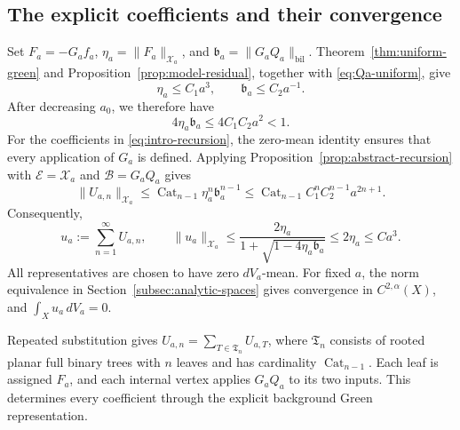 \documentclass[11pt,a4paper,twoside]{article}
\numberwithin{equation}{section}
\theoremstyle{definition}
\theoremstyle{remark}
\begin{document}
\subsection{The explicit coefficients and their convergence}
\label{subsec:binary-tree-series}
Set \(F_a=-G_af_a\),
\(\eta_a=\|F_a\|_{\mathcal X_a}\), and
\(\mathfrak b_a=\|G_aQ_a\|_{\mathrm{bil}}\).
Theorem~\ref{thm:uniform-green} and
Proposition~\ref{prop:model-residual}, together with
\eqref{eq:Qa-uniform}, give
\begin{equation}\label{eq:Fa-small}
\eta_a\le C_1a^3,
\qquad \mathfrak b_a\le C_2a^{-1}.
\end{equation}
After decreasing \(a_0\), we therefore have
\begin{equation}\label{eq:Catalan-smallness}
4\eta_a\mathfrak b_a\le4C_1C_2a^2<1.
\end{equation}
For the coefficients in \eqref{eq:intro-recursion}, the zero-mean
identity ensures that every application of \(G_a\) is defined.
Applying Proposition~\ref{prop:abstract-recursion} with
\(\mathcal E=\mathcal X_a\) and \(\mathcal B=G_aQ_a\) gives
\begin{equation}\label{eq:Catalan-estimate}
\|U_{a,n}\|_{\mathcal X_a}
\le\operatorname{Cat}_{n-1}\eta_a^n\mathfrak b_a^{n-1}
\le\operatorname{Cat}_{n-1}C_1^nC_2^{n-1}a^{2n+1}.
\end{equation}
Consequently,
\begin{equation}\label{eq:ua-majorant}
u_a:=\sum_{n=1}^{\infty}U_{a,n},
\qquad \|u_a\|_{\mathcal X_a}
\le\frac{2\eta_a}{1+\sqrt{1-4\eta_a\mathfrak b_a}}
\le2\eta_a\le Ca^3.
\end{equation}
All representatives are chosen to have zero \(dV_a\)-mean.
For fixed \(a\), the norm equivalence in
Section~\ref{subsec:analytic-spaces} gives convergence in
\(C^{2,\alpha}(X)\), and \(\int_Xu_a\,dV_a=0\).

Repeated substitution gives
\(U_{a,n}=\sum_{T\in\mathfrak T_n}U_{a,T}\), where
\(\mathfrak T_n\) consists of rooted planar full binary trees
with \(n\) leaves and has cardinality \(\operatorname{Cat}_{n-1}\).
Each leaf is assigned \(F_a\), and
each internal vertex applies \(G_aQ_a\) to its two inputs.
This determines every coefficient through the explicit background
Green representation.
\end{document}
